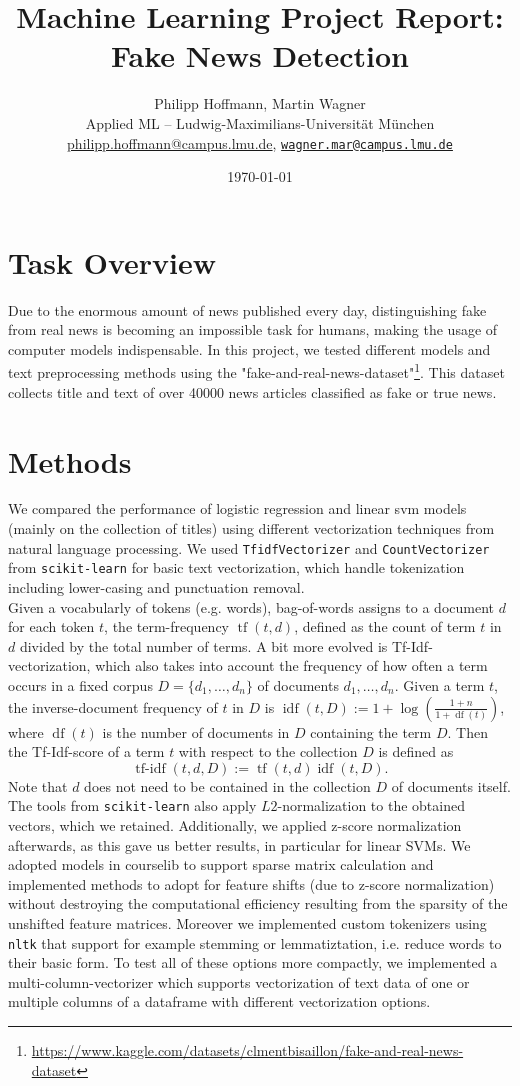 \documentclass[10pt]{article}
\title{\textbf{Machine Learning Project Report: Fake News Detection}}
\author{Philipp Hoffmann, Martin Wagner \\
	Applied ML – Ludwig-Maximilians-Universität München \\
	\href{mailto:philipp.hoffmann@campus.lmu.de}{philipp.hoffmann@campus.lmu.de},
	\texttt{\href{mailto:wagner.mar@campus.lmu.de}{wagner.mar@campus.lmu.de}}}
\date{\today}
\begin{document}
	
	\maketitle
	
	\section{Task Overview}
	Due to the enormous amount of news published every day, distinguishing fake from real news is becoming an impossible task for humans, making the usage of computer models indispensable. In this project, we tested different models and text preprocessing methods using the "fake-and-real-news-dataset"\footnote{\url{https://www.kaggle.com/datasets/clmentbisaillon/fake-and-real-news-dataset}}. This dataset collects title and text of over 40000 news articles classified as fake or true news.
	
	\section{Methods}
	We compared the performance of logistic regression and linear svm models (mainly on the collection of titles) using different vectorization techniques from natural language processing. 
	We used \texttt{TfidfVectorizer} and \texttt{CountVectorizer} from \texttt{scikit-learn} for basic text vectorization, which handle tokenization including lower-casing and punctuation removal.\\
	
	Given a vocabularly of tokens (e.g. words), bag-of-words assigns to a document $d$ for each token $t$, the term-frequency $\operatorname{tf}(t,d)$, defined as the count of term $t$ in $d$ divided by the total number of terms. A bit more evolved is Tf-Idf-vectorization, which also takes into account the frequency of how often a term occurs in a fixed corpus $D=\{d_1, \dots, d_n\}$ of documents $d_1, \dots, d_n$. Given a term $t$, the inverse-document frequency of $t$ in $D$ is $\operatorname{idf}(t,D):=1+\log\left(\frac{1+n}{1+\operatorname{df}(t)}\right)$, where $\operatorname{df}(t)$ is the number of documents in $D$ containing the term $D$. Then the Tf-Idf-score of a term $t$ with respect to the collection $D$ is defined as \[\operatorname{tf-idf}(t,d,D):=\operatorname{tf}(t,d)\operatorname{idf}(t,D).\]
	Note that $d$ does not need to be contained in the collection $D$ of documents itself. The tools from \texttt{scikit-learn} also apply $L2$-normalization to the obtained vectors, which we retained. Additionally, we applied z-score normalization afterwards, as this gave us better results, in particular for linear SVMs. 
	We adopted models in courselib to support sparse matrix calculation and implemented methods to adopt for feature shifts (due to z-score normalization) without destroying the computational efficiency resulting from the sparsity of the unshifted feature matrices. Moreover we implemented custom tokenizers using \texttt{nltk} 
	that support for example stemming or lemmatiztation, i.e. reduce words to their basic form. To test all of these options more compactly, we implemented a multi-column-vectorizer which supports vectorization of text data of one or multiple columns of a dataframe with different vectorization options.
	
\end{document}
